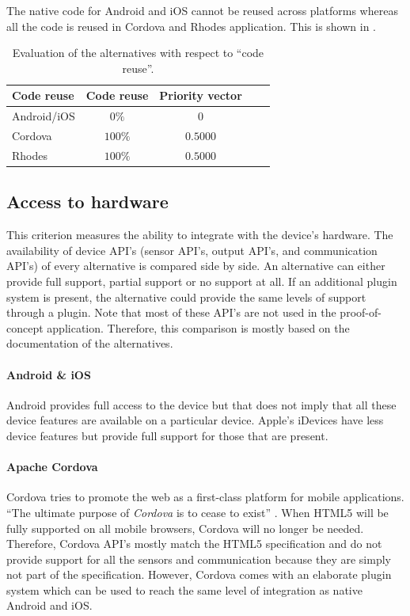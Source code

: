 The native code for Android and iOS cannot be reused across platforms whereas all the code is reused in Cordova and Rhodes application. This is shown in . 

\begin{table}[h!]
    \centering
    \begin{tabular}{lcccl}
        \hline
        \textbf{Code reuse} & Code reuse & Priority vector \\
        \hline
        Android/iOS         & $0\%$       & $0$            \\
        Cordova             & $100\%$     & $0.5000$       \\
        Rhodes              & $100\%$     & $0.5000$       \\
        \hline
    \end{tabular}
    \caption{Evaluation of the alternatives with respect to ``code reuse''.}
    \label{tab:cr}
\end{table}

\subsection{Access to hardware}

This criterion measures the ability to integrate with the device's hardware. The availability of device API's (sensor API's, output API's, and communication API's) of every alternative is compared side by side. An alternative can either provide full support, partial support or no support at all. If an additional plugin system is present, the alternative could provide the same levels of support through a plugin. Note that most of these API's are not used in the proof-of-concept application. Therefore, this comparison is mostly based on the documentation of the alternatives.

\paragraph{Android \& iOS} Android provides full access to the device but that does not imply that all these device features are available on a particular device. Apple's iDevices have less device features but provide full support for those that are present.

\paragraph{Apache Cordova} Cordova tries to promote the web as a first-class platform for mobile applications. ``The ultimate purpose of \emph{Cordova} is to cease to exist'' \cite{LeRoux:2012}. When HTML5 will be fully supported on all mobile browsers, Cordova will no longer be needed. Therefore, Cordova API's mostly match the HTML5 specification and do not provide support for all the sensors and communication because they are simply not part of the specification. However, Cordova comes with an elaborate plugin system which can be used to reach the same level of integration as native Android and iOS. 

